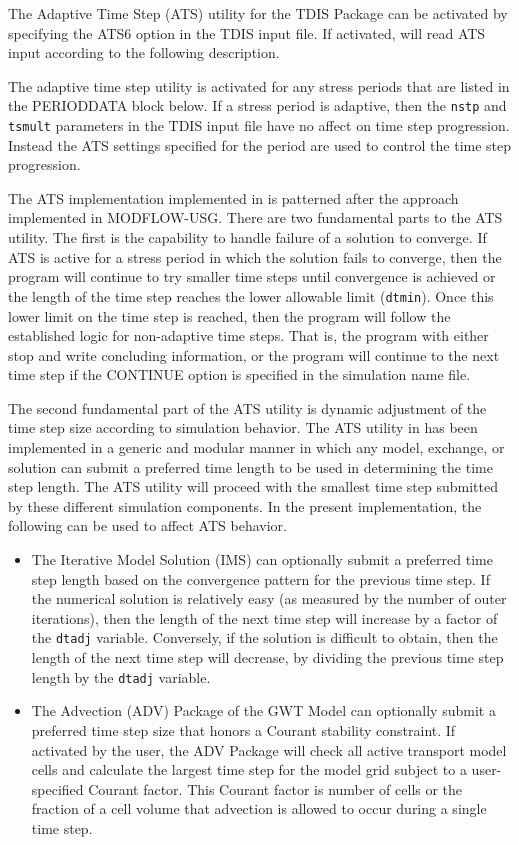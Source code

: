The Adaptive Time Step (ATS) utility for the TDIS Package can be activated by specifying the ATS6 option in the TDIS input file.  If activated, \mf will read ATS input according to the following description.

The adaptive time step utility is activated for any stress periods that are listed in the PERIODDATA block below.  If a stress period is adaptive, then the \texttt{nstp} and \texttt{tsmult} parameters in the TDIS input file have no affect on time step progression.  Instead the ATS settings specified for the period are used to control the time step progression.

The ATS implementation implemented in \mf is patterned after the approach implemented in MODFLOW-USG.  There are two fundamental parts to the ATS utility.  The first is the capability to handle failure of a solution to converge.  If ATS is active for a stress period in which the solution fails to converge, then the program will continue to try smaller time steps until convergence is achieved or the length of the time step reaches the lower allowable limit (\texttt{dtmin}).  Once this lower limit on the time step is reached, then the program will follow the established logic for non-adaptive time steps.  That is, the program with either stop and write concluding information, or the program will continue to the next time step if the CONTINUE option is specified in the simulation name file.

The second fundamental part of the ATS utility is dynamic adjustment of the time step size according to simulation behavior.  The ATS utility in \mf has been implemented in a generic and modular manner in which any model, exchange, or solution can submit a preferred time length to be used in determining the time step length.  The ATS utility will proceed with the smallest time step submitted by these different simulation components.  In the present implementation, the following can be used to affect ATS behavior.

\begin{itemize}
\item The Iterative Model Solution (IMS) can optionally submit a preferred time step length based on the convergence pattern for the previous time step.  If the numerical solution is relatively easy (as measured by the number of outer iterations), then the length of the next time step will increase by a factor of the \texttt{dtadj} variable.  Conversely, if the solution is difficult to obtain, then the length of the next time step will decrease, by dividing the previous time step length by the \texttt{dtadj} variable.  
\item The Advection (ADV) Package of the GWT Model can optionally submit a preferred time step size that honors a Courant stability constraint.  If activated by the user, the ADV Package will check all active transport model cells and calculate the largest time step for the model grid subject to a user-specified Courant factor.  This Courant factor is number of cells or the fraction of a cell volume that advection is allowed to occur during a single time step.
\end{itemize}


